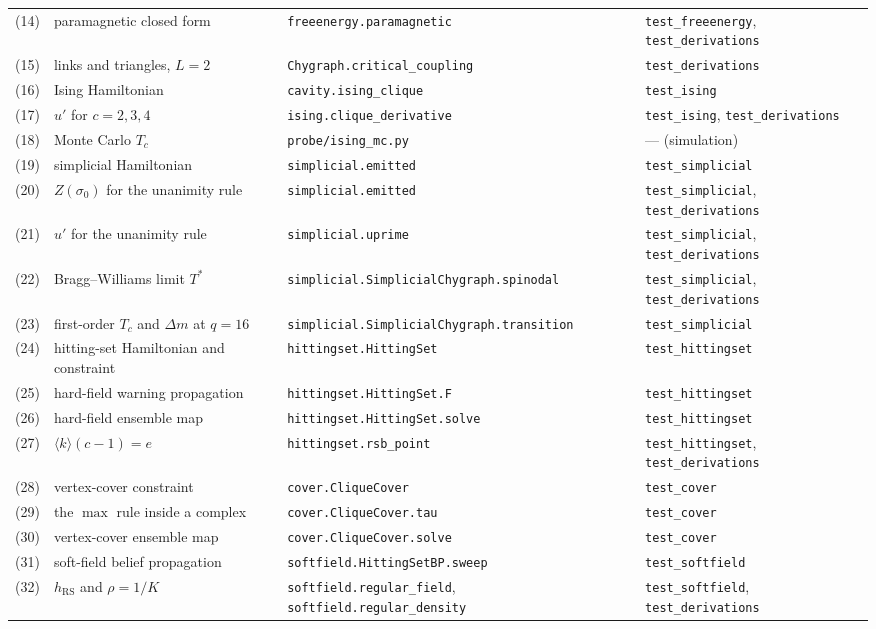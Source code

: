 \documentclass[aps,pre,onecolumn,superscriptaddress,floatfix,nofootinbib]{revtex4-2}
\newcommand{\ave}[1]{\langle #1 \rangle}
\newcommand{\code}[1]{\texttt{#1}}
\begin{document}
{\begin{longtable}{@{}r L{0.29\textwidth} L{0.37\textwidth} L{0.17\textwidth}@{}}
(14) & paramagnetic closed form & \code{freeenergy.paramagnetic} & \code{test\_freeenergy}, \code{test\_derivations} \\
(15) & links and triangles, $L=2$ & \code{Chygraph.critical\_coupling} & \code{test\_derivations} \\
(16) & Ising Hamiltonian & \code{cavity.ising\_clique} & \code{test\_ising} \\
(17) & $u'$ for $c=2,3,4$ & \code{ising.clique\_derivative} & \code{test\_ising}, \code{test\_derivations} \\
(18) & Monte Carlo $T_c$ & \code{probe/ising\_mc.py} & --- (simulation) \\
(19) & simplicial Hamiltonian & \code{simplicial.emitted} & \code{test\_simplicial} \\
(20) & $Z(\sigma_0)$ for the unanimity rule & \code{simplicial.emitted} & \code{test\_simplicial}, \code{test\_derivations} \\
(21) & $u'$ for the unanimity rule & \code{simplicial.uprime} & \code{test\_simplicial}, \code{test\_derivations} \\
(22) & Bragg--Williams limit $T^\ast$ & \code{simplicial.SimplicialChygraph.spinodal} & \code{test\_simplicial}, \code{test\_derivations} \\
(23) & first-order $T_c$ and $\Delta m$ at $q=16$ & \code{simplicial.SimplicialChygraph.transition} & \code{test\_simplicial} \\
(24) & hitting-set Hamiltonian and constraint & \code{hittingset.HittingSet} & \code{test\_hittingset} \\
(25) & hard-field warning propagation & \code{hittingset.HittingSet.F} & \code{test\_hittingset} \\
(26) & hard-field ensemble map & \code{hittingset.HittingSet.solve} & \code{test\_hittingset} \\
(27) & $\ave{k}(c-1)=e$ & \code{hittingset.rsb\_point} & \code{test\_hittingset}, \code{test\_derivations} \\
(28) & vertex-cover constraint & \code{cover.CliqueCover} & \code{test\_cover} \\
(29) & the $\max$ rule inside a complex & \code{cover.CliqueCover.tau} & \code{test\_cover} \\
(30) & vertex-cover ensemble map & \code{cover.CliqueCover.solve} & \code{test\_cover} \\
(31) & soft-field belief propagation & \code{softfield.HittingSetBP.sweep} & \code{test\_softfield} \\
(32) & $h_{\mathrm{RS}}$ and $\rho=1/K$ & \code{softfield.regular\_field}, \code{softfield.regular\_density} & \code{test\_softfield}, \code{test\_derivations} \\

\end{longtable}}
\end{document}
